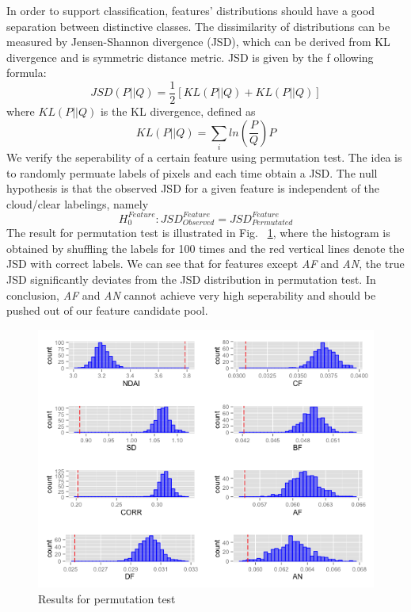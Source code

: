 \documentclass[english]{article}\usepackage{graphicx, color}
\numberwithin{equation}{section}
\numberwithin{figure}{section}
\begin{document}
In order to support classification, features' distributions should have a good 
separation between distinctive classes. The dissimilarity of distributions can 
be measured by Jensen-Shannon divergence (JSD), which can be derived 
from KL divergence and is symmetric distance metric. JSD is given by the f
ollowing formula:
\begin{equation}
JSD(P||Q) = \frac{1}{2} [KL(P||Q) + KL(P||Q)]
\end{equation}
where $KL(P||Q)$ is the KL divergence, defined as 
\begin{equation}
KL(P||Q) = \sum_i{ln(\frac{P}{Q})P}
\end{equation}
We verify the seperability of a certain feature using permutation test. The idea 
is to randomly permuate labels of pixels and each time obtain a JSD. The null 
hypothesis is that the observed JSD for a given feature is independent of the 
cloud/clear labelings, namely
\begin{equation}
H_0^{Feature}:JSD_{Observed}^{Feature}=JSD_{Permutated}^{Feature}
\end{equation}
The result for permutation test is illustrated in Fig. ~\ref{fig:PT}, where the 
histogram is obtained by shuffling the labels 
for 100 times and the red vertical lines 
denote the JSD with correct labels. We can see that for features except 
\textit{AF} and \textit{AN}, the true JSD significantly deviates from the JSD 
distribution in permutation test. In conclusion, \textit{AF} and \textit{AN} 
cannot achieve very high seperability and should be pushed out of our 
feature candidate pool.

\begin{figure}[!h]
  \begin{center}
    \includegraphics[width=\columnwidth]{../figures/PermutationTest.png}
  \end{center}
  \caption{Results for permutation test}
  \label{fig:PT}
\end{figure}
\end{document}
